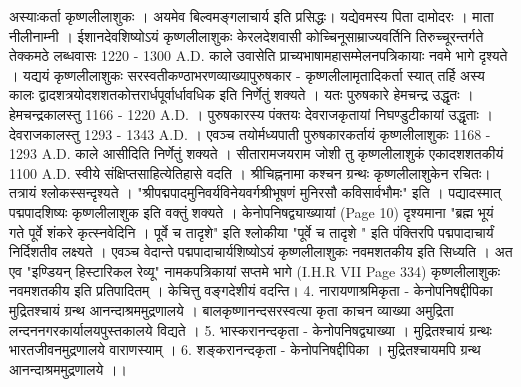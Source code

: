 अस्याःकर्ता कृष्णलीलाशुकः । अयमेव बिल्वमङ्गलाचार्य इति प्रसिद्धः। यद्येवमस्य पिता दामोदरः । माता नीलीनाम्नी । ईशानदेवशिष्योऽयं कृष्णलीलाशुकः केरलदेशवासी कोच्चिनूसाम्राज्यवर्तिनि तिरुच्चूरन्तर्गते तेक्कमठे लब्धवासः 
1220 - 1300 A.D. काले उवासेति प्राच्यभाषामहासम्मेलनपत्रिकायाः नवमे भागे दृश्यते ।
यद्ययं कृष्णलीलाशुकः सरस्वतीकण्ठाभरणव्याख्यापुरुषकार - कृष्णलीलामृतादिकर्ता स्यात् तर्हि अस्य कालः द्वादशत्रयोदशशतकोत्तरार्धपूर्वार्धावधिक इति निर्णेतुं शक्यते । यतः पुरुषकारे हेमचन्द्र उद्धृतः । हेमचन्द्रकालस्तु 1166 - 1220 A.D. । पुरुषकारस्य पंक्तयः देवराजकृतायां निघण्डुटीकायां उद्धृताः । देवराजकालस्तु 1293 - 1343 A.D. । एवञ्च तयोर्मध्यपाती  पुरुषकारकर्तायं कृष्णलीलाशुकः 1168 - 1293 A.D. काले आसीदिति निर्णेतुं शक्यते ।
सीतारामजयराम जोशी तु कृष्णलीलाशुकं एकादशशतकीयं 1100 A.D. स्वीये संक्षिप्तसाहित्येतिहासे वदति । 
श्रीचिह्ननामा कश्चन ग्रन्थः कृष्णलीलाशुकेन रचितः। तत्रायं श्लोकस्सन्दृश्यते । "श्रीपद्मपादमुनिवर्यविनेयवर्गश्रीभूषणं मुनिरसौ कविसार्वभौमः" इति । पद्यादस्मात् पद्मपादशिष्यः कृष्णलीलाशुक इति वक्तुं शक्यते । केनोपनिषद्व्याख्यायां (Page 10)  दृश्यमाना "ब्रह्म भूयं गते पूर्वे शंकरे कृत्स्नवेदिनि । पूर्वे च तादृशे" इति श्लोकीया "पूर्वे च तादृशे " इति पंक्तिरपि पद्मपादाचार्यं निर्दिशतीव लक्ष्यते । एवञ्च वेदान्ते पद्मपादाचार्यशिष्योऽयं कृष्णलीलाशुकः नवमशतकीय इति सिध्यति । अत एव "इण्डियन् हिस्टारिकल रेव्यू" नामकपत्रिकायां सप्तमे भागे (I.H.R VII Page 334) कृष्णलीलाशुकः नवमशतकीय इति प्रतिपादितम् । केचित्तु वङ्गदेशीयं वदन्ति। 
4.  नारायणाश्रमिकृता - केनोपनिषद्दीपिका 
मुद्रितश्चायं ग्रन्थ आनन्दाश्रममुद्रणालये । बालकृष्णानन्दसरस्वत्या कृता काचन व्याख्या अमुद्रिता लन्दननगरकार्यालयपुस्तकालये विद्यते ।
5. भास्करानन्दकृता - केनोपनिषद्व्याख्या । मुद्रितश्चायं ग्रन्थः भारतजीवनमुद्रणालये वाराणस्याम् । 
6. शङ्करानन्दकृता - केनोपनिषद्दीपिका । मुद्रितश्चायमपि ग्रन्थ आनन्दाश्रममुद्रणालये ।। 

